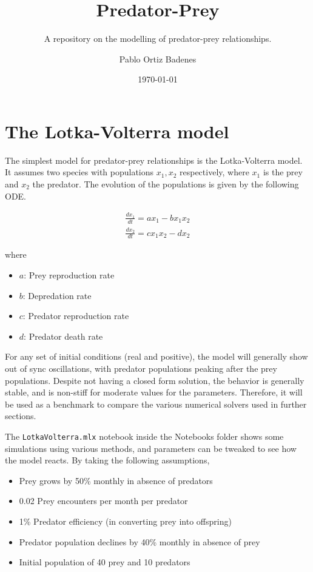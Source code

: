 \documentclass[11pt,oneside,parskip=half]{scrbook}  %
\title{\Huge\bfseries\sffamily Predator-Prey}
\subtitle{\large A repository on the modelling of predator-prey relationships.}
\author{Pablo Ortiz Badenes}
\date{\today}
\begin{document}
\frontmatter
\maketitle
\tableofcontents
\listoffigures

\mainmatter

\chapter{The Lotka-Volterra model}

The simplest model for predator-prey relationships is the Lotka-Volterra model. It assumes two species with populations $x_1,x_2$ respectively, where $x_1$ is the prey and $x_2$ the predator. The evolution of the populations is given by the following ODE.

$$
\begin{matrix}
\frac{dx_1}{dt}=a x_1-bx_1x_2 \\
\frac{dx_2}{dt}= c x_1x_2-dx_2
\end{matrix}
$$

where

\begin{itemize}
    \item{$a$: Prey reproduction rate}
    \item{$b$: Depredation rate}
    \item{$c$: Predator reproduction rate}
    \item{$d$: Predator death rate}
\end{itemize}

For any set of initial conditions (real and positive), the model will generally show out of sync oscillations, with predator populations peaking after the prey populations. Despite not having a closed form solution, the behavior is generally stable, and is non-stiff for moderate values for the parameters. Therefore, it will be used as a benchmark to compare the various numerical solvers used in further sections.

The \texttt{LotkaVolterra.mlx} notebook inside the Notebooks folder shows some simulations using various methods, and parameters can be tweaked to see how the model reacts. By taking the following assumptions,

\begin{itemize}
    \item{Prey grows by 50\% monthly in absence of predators}
    \item{0.02 Prey encounters per month per predator}
    \item{1\% Predator efficiency (in converting prey into offspring)}
    \item{Predator population declines by 40\% monthly in absence of prey}
    \item{Initial population of 40 prey and 10 predators}
\end{itemize}
\end{document}
